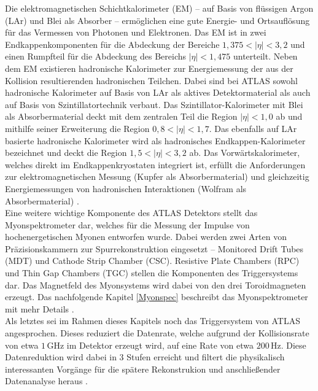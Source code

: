 Die elektromagnetischen Schichtkalorimeter (EM) -- auf Basis von flüssigen Argon (LAr) und Blei als Absorber -- ermöglichen eine gute Energie- und Ortsauflösung für das Vermessen von Photonen und Elektronen. Das EM ist in zwei Endkappenkomponenten für die Abdeckung der Bereiche $1,375<|\eta|<3,2$ und einen Rumpfteil für die Abdeckung des Bereichs $|\eta|<1,475$ unterteilt. Neben dem  EM existieren hadronische Kalorimeter zur Energiemessung der aus der Kollision resultierenden hadronischen Teilchen. Dabei sind bei ATLAS sowohl hadronische Kalorimeter auf Basis von LAr als aktives Detektormaterial als auch auf Basis von Szintillatortechnik verbaut. Das Szintillator-Kalorimeter mit Blei als Absorbermaterial deckt mit dem zentralen Teil die Region $|\eta|<1,0$ ab und mithilfe seiner Erweiterung die Region $0,8<|\eta|<1,7$. Das ebenfalls auf LAr basierte hadronische Kalorimeter wird als hadronisches Endkappen-Kalorimeter bezeichnet und deckt die Region $1,5<|\eta|<3,2$ ab. Das Vorwärtskalorimeter, welches direkt im Endkappenkryostaten integriert ist, erfüllt die Anforderungen zur elektromagnetischen Messung (Kupfer als Absorbermaterial) und gleichzeitig Energiemessungen von hadronischen Interaktionen (Wolfram als Absorbermaterial) \cite{ATLAS}.\\
Eine weitere wichtige Komponente des ATLAS Detektors stellt das Myon\-spek\-tro\-me\-ter dar, welches für die Messung der Impulse von hochenergetischen Myonen entworfen wurde. Dabei werden zwei Arten von Präzisionskammern zur Spurrekonstruktion eingesetzt -- Monitored Drift Tubes (MDT) und Cathode Strip Chamber (CSC). Resistive Plate Chambers (RPC) und Thin Gap Chambers (TGC) stellen die Komponenten des Triggersystems dar. Das Magnetfeld des Myonsystems wird dabei von den drei Toroidmagneten erzeugt. Das nachfolgende Kapitel \ref{Myonspec} beschreibt das Myonspektrometer mit mehr Details \cite{ATLAS}.\\
Als letztes sei im Rahmen dieses Kapitels noch das Triggersystem von ATLAS angesprochen. Dieses reduziert die Datenrate, welche aufgrund der Kollisionsrate von etwa $1\,$GHz im Detektor erzeugt wird, auf eine Rate von etwa $200\,$Hz. Diese Datenreduktion wird dabei in 3 Stufen erreicht und filtert die physikalisch interessanten Vorgänge für die spätere Rekonstrukion und anschließender Datenanalyse heraus \cite{MS}.  
